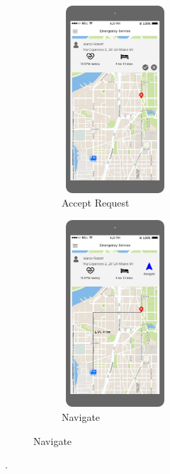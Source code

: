 \begin{figure}[H]
	\centering
	\begin{subfigure}[b]{0.4\textwidth}	
		\includegraphics[width=4cm,height=7cm]		{./RASD_Mockups/1-Ambulance.png}
      	\caption{Accept Request}
        \label{TrackMe_ambulance}
	 \end{subfigure}
     \begin{subfigure}[b]{0.4\textwidth}	
		\includegraphics[width=4cm,height=7cm]		{./RASD_Mockups/2-Ambulance.png}
      	\caption{Navigate}
        \label{TrackMe_navigate}
	 \end{subfigure}
\end{figure}
.\newline\newline

